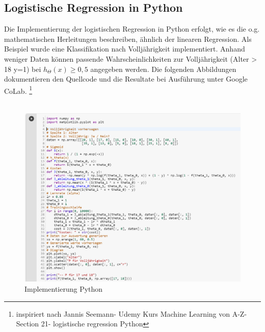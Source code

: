 \documentclass[a4paper]{scrreprt}
\begin{document}
\subsection{Logistische Regression in Python}
Die Implementierung der logistischen Regression in Python erfolgt, wie es die o.g. mathematischen Herleitungen beschreiben, ähnlich der linearen Regression. Als Beispiel wurde eine Klassifikation nach Volljährigkeit implementiert. Anhand weniger Daten können passende Wahrscheinlichkeiten zur Volljährigkeit (Alter > 18 y=1) bei $h_{\Theta}(x)\geq0,5$ angegeben werden. Die folgenden Abbildungen dokumentieren den Quellcode und die Resultate bei Ausführung unter Google CoLab.
\footnote{inspiriert nach Jannis Seemann- Udemy Kurs Machine Learning von A-Z- Section 21- logistische regression Python}
\\\\
%
\begin{figure}[hpt]
\centering
\includegraphics[scale=.84]{Abbildungen/Logistische_Regression_Python_1}
\caption{Implementierung Python}
\label{figure}
\end{figure}
%
\end{document}
